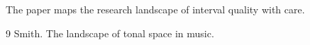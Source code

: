 \documentclass{article}
\begin{document}
The paper maps the research landscape of interval quality with care.
\begin{thebibliography}{9}
 Smith. The landscape of tonal space in music.
\end{thebibliography}
\end{document}
